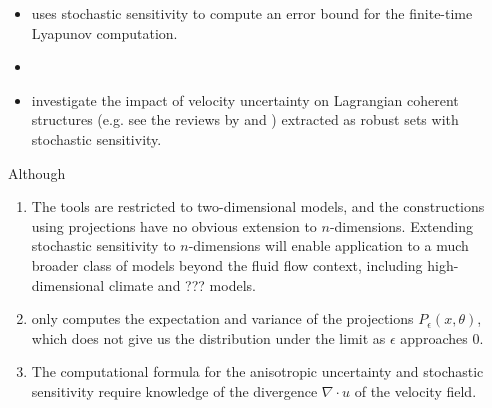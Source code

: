 \begin{itemize}
	\item \citet{Balasuriya_2020_UncertaintyFinitetimeLyapunov} uses stochastic sensitivity to compute an error bound for the finite-time Lyapunov computation.


	\item \citet{FangEtAl_2020_DisentanglingResolutionPrecision} 


	\item \citet{BadzaEtAl_2023_HowSensitiveAre} investigate the impact of velocity uncertainty on Lagrangian coherent structures (e.g. see the reviews by \citet{BalasuriyaEtAl_2018_GeneralizedLagrangianCoherent} and \citet{HadjighasemEtAl_2017_CriticalComparisonLagrangian}) extracted as robust sets with stochastic sensitivity.

\end{itemize}

Although

\begin{enumerate}
	\item The tools are restricted to two-dimensional models, and the constructions using projections have no obvious extension to \(n\)-dimensions.
	      Extending stochastic sensitivity to \(n\)-dimensions will enable application to a much broader class of models beyond the fluid flow context, including high-dimensional climate and ??? models.

	\item \citet{Balasuriya_2020_StochasticSensitivityComputable} only computes the expectation and variance of the projections \(P_\epsilon(x,\theta)\), which does not give us the distribution under the limit as \(\epsilon\) approaches 0.

	\item The computational formula for the anisotropic uncertainty and stochastic sensitivity require knowledge of the divergence \(\nabla\cdot u\) of the velocity field.
\end{enumerate}



